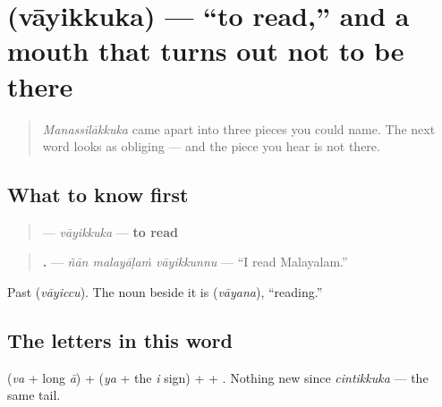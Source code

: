 \section[\texorpdfstring{\ml{വായിക്കുക} (vāyikkuka)}{വായിക്കുക (vāyikkuka)}]{ (vāyikkuka) — \textquotedblleft{}to read,\textquotedblright{} and a mouth that turns out not to be there}

\label{lesson:ML-C33-vaayikkuka}



\begin{quote}
\emph{Manassilākkuka} came apart into three pieces you could name. The next word looks as obliging — and the piece you hear is not there.
\end{quote}

\subsection*{What to know first}
\begin{quote}
\textbf{} — \emph{vāyikkuka} — \textbf{to read}
\end{quote}

\begin{quote}
\textbf{  .} — \emph{ñān malayāḷaṁ vāyikkunnu} — \textquotedblleft{}I read Malayalam.\textquotedblright{}
\end{quote}

Past \textbf{} (\emph{vāyiccu}). The noun beside it is \textbf{} (\emph{vāyana}), \textquotedblleft{}reading.\textquotedblright{}

\subsection*{The letters in this word}
\textbf{} (\emph{va} + long \emph{ā}) + \textbf{} (\emph{ya} + the \emph{i} sign) + \textbf{} + \textbf{}. Nothing new since \emph{cintikkuka} — the same \textbf{} tail.

